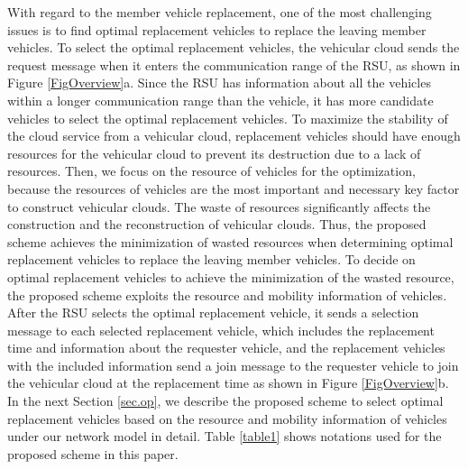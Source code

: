 \documentclass[electronics,aricle,accept,pdftex,moreauthors]{Definitions/mdpi}
\begin{document}
With regard to the member vehicle replacement, one of the most challenging issues is to find optimal replacement vehicles to replace the leaving member vehicles. 
To select the optimal replacement vehicles, the vehicular cloud sends the request message when it enters the communication range of the RSU, as shown in Figure \ref{FigOverview}a.
Since the RSU has information about all the vehicles within a longer communication range than the vehicle, it has more candidate vehicles to select the optimal replacement vehicles.
To maximize the stability of the cloud service from a vehicular cloud, replacement vehicles should have enough resources for the vehicular cloud to prevent its destruction due to a lack of resources.
Then, we focus on the resource of vehicles for the optimization, because the resources of vehicles are the most important and necessary key factor to construct vehicular clouds.
The waste of resources significantly affects the construction and the reconstruction of vehicular clouds. 
Thus, the proposed scheme achieves the minimization of wasted resources when determining optimal replacement vehicles to replace the leaving member vehicles.
To decide on optimal replacement vehicles to achieve the minimization of the wasted resource, the proposed scheme exploits the resource and mobility information of vehicles.
After the RSU selects the optimal replacement vehicle, it sends a selection message to each selected replacement vehicle, which includes the replacement time and information about the requester vehicle, and the replacement vehicles with the included information send a join message to the requester vehicle to join the vehicular cloud at the replacement time as shown in Figure \ref{FigOverview}b.
In the next Section \ref{sec.op}, we describe the proposed scheme to select optimal replacement vehicles based on the resource and mobility information of vehicles under our network model in detail.
Table \ref{table1} shows notations used for the proposed scheme in this paper.


\end{document}
